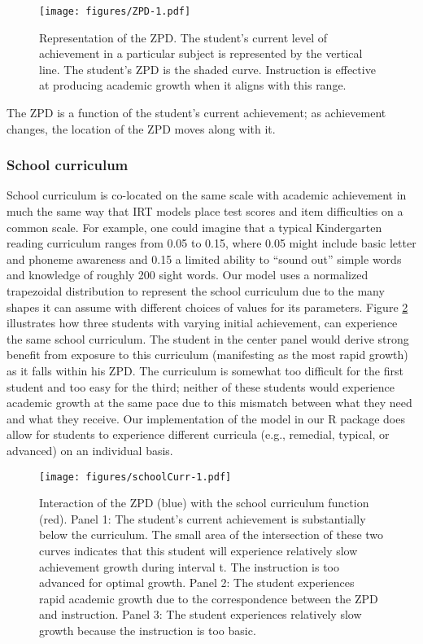 \documentclass[english,floatsintext,jou]{apa6}
\theoremstyle{definition}
\theoremstyle{definition}
\theoremstyle{definition}
\theoremstyle{remark}
\begin{document}
\begin{figure}[htbp]
\centering
\texttt{[image: figures/ZPD-1.pdf]}
\caption{\label{fig:ZPD}Representation of the ZPD. The student's current
level of achievement in a particular subject is represented by the
vertical line. The student's ZPD is the shaded curve. Instruction is
effective at producing academic growth when it aligns with this range.}
\end{figure}

The ZPD is a function of the student's current achievement; as
achievement changes, the location of the ZPD moves along with it.

\subsubsection{School curriculum}\label{school-curriculum}

School curriculum is co-located on the same scale with academic
achievement in much the same way that IRT models place test scores and
item difficulties on a common scale. For example, one could imagine that
a typical Kindergarten reading curriculum ranges from 0.05 to 0.15,
where 0.05 might include basic letter and phoneme awareness and 0.15 a
limited ability to \enquote{sound out} simple words and knowledge of
roughly 200 sight words. Our model uses a normalized trapezoidal
distribution to represent the school curriculum due to the many shapes
it can assume with different choices of values for its parameters.
Figure \ref{fig:schoolCurr} illustrates how three students with varying
initial achievement, can experience the same school curriculum. The
student in the center panel would derive strong benefit from exposure to
this curriculum (manifesting as the most rapid growth) as it falls
within his ZPD. The curriculum is somewhat too difficult for the first
student and too easy for the third; neither of these students would
experience academic growth at the same pace due to this mismatch between
what they need and what they receive. Our implementation of the model in
our R package does allow for students to experience different curricula
(e.g., remedial, typical, or advanced) on an individual basis.

\begin{figure}[htbp]
\centering
\texttt{[image: figures/schoolCurr-1.pdf]}
\caption{\label{fig:schoolCurr}Interaction of the ZPD (blue) with the school
curriculum function (red). Panel 1: The student's current achievement is
substantially below the curriculum. The small area of the intersection
of these two curves indicates that this student will experience
relatively slow achievement growth during interval t. The instruction is
too advanced for optimal growth. Panel 2: The student experiences rapid
academic growth due to the correspondence between the ZPD and
instruction. Panel 3: The student experiences relatively slow growth
because the instruction is too basic.}
\end{figure}
\end{document}
